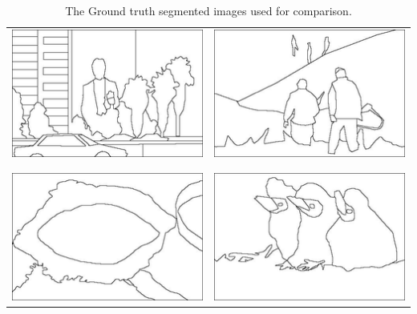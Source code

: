 \documentclass{article}
\begin{document}
\begin{center}
\begin{table}
\begin{tabular}{c| c}
\includegraphics[scale = 0.7]{edge_1} & \includegraphics[scale = 0.7]{edge_2}\\
\\\hline\\
\includegraphics[scale = 0.7]{edge_3} & \includegraphics[scale = 0.7]{edge_4}\\
\end{tabular}
\caption{The Ground truth segmented images used for comparison.}
\label{table:2}
\end{table}
\end{center}
\end{document}
